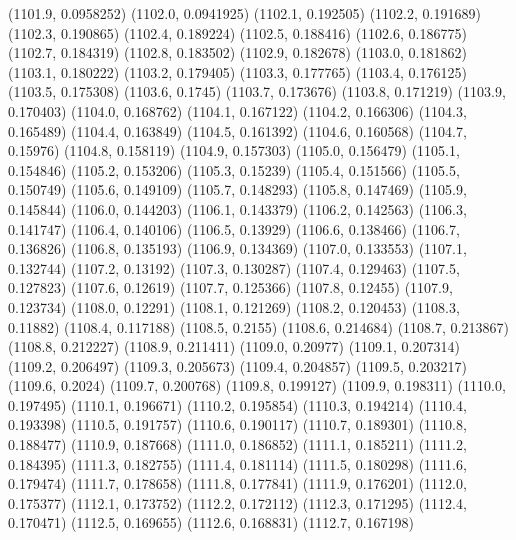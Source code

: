 {					(1101.9, 0.0958252)
					(1102.0, 0.0941925)
					(1102.1, 0.192505)
					(1102.2, 0.191689)
					(1102.3, 0.190865)
					(1102.4, 0.189224)
					(1102.5, 0.188416)
					(1102.6, 0.186775)
					(1102.7, 0.184319)
					(1102.8, 0.183502)
					(1102.9, 0.182678)
					(1103.0, 0.181862)
					(1103.1, 0.180222)
					(1103.2, 0.179405)
					(1103.3, 0.177765)
					(1103.4, 0.176125)
					(1103.5, 0.175308)
					(1103.6, 0.1745)
					(1103.7, 0.173676)
					(1103.8, 0.171219)
					(1103.9, 0.170403)
					(1104.0, 0.168762)
					(1104.1, 0.167122)
					(1104.2, 0.166306)
					(1104.3, 0.165489)
					(1104.4, 0.163849)
					(1104.5, 0.161392)
					(1104.6, 0.160568)
					(1104.7, 0.15976)
					(1104.8, 0.158119)
					(1104.9, 0.157303)
					(1105.0, 0.156479)
					(1105.1, 0.154846)
					(1105.2, 0.153206)
					(1105.3, 0.15239)
					(1105.4, 0.151566)
					(1105.5, 0.150749)
					(1105.6, 0.149109)
					(1105.7, 0.148293)
					(1105.8, 0.147469)
					(1105.9, 0.145844)
					(1106.0, 0.144203)
					(1106.1, 0.143379)
					(1106.2, 0.142563)
					(1106.3, 0.141747)
					(1106.4, 0.140106)
					(1106.5, 0.13929)
					(1106.6, 0.138466)
					(1106.7, 0.136826)
					(1106.8, 0.135193)
					(1106.9, 0.134369)
					(1107.0, 0.133553)
					(1107.1, 0.132744)
					(1107.2, 0.13192)
					(1107.3, 0.130287)
					(1107.4, 0.129463)
					(1107.5, 0.127823)
					(1107.6, 0.12619)
					(1107.7, 0.125366)
					(1107.8, 0.12455)
					(1107.9, 0.123734)
					(1108.0, 0.12291)
					(1108.1, 0.121269)
					(1108.2, 0.120453)
					(1108.3, 0.11882)
					(1108.4, 0.117188)
					(1108.5, 0.2155)
					(1108.6, 0.214684)
					(1108.7, 0.213867)
					(1108.8, 0.212227)
					(1108.9, 0.211411)
					(1109.0, 0.20977)
					(1109.1, 0.207314)
					(1109.2, 0.206497)
					(1109.3, 0.205673)
					(1109.4, 0.204857)
					(1109.5, 0.203217)
					(1109.6, 0.2024)
					(1109.7, 0.200768)
					(1109.8, 0.199127)
					(1109.9, 0.198311)
					(1110.0, 0.197495)
					(1110.1, 0.196671)
					(1110.2, 0.195854)
					(1110.3, 0.194214)
					(1110.4, 0.193398)
					(1110.5, 0.191757)
					(1110.6, 0.190117)
					(1110.7, 0.189301)
					(1110.8, 0.188477)
					(1110.9, 0.187668)
					(1111.0, 0.186852)
					(1111.1, 0.185211)
					(1111.2, 0.184395)
					(1111.3, 0.182755)
					(1111.4, 0.181114)
					(1111.5, 0.180298)
					(1111.6, 0.179474)
					(1111.7, 0.178658)
					(1111.8, 0.177841)
					(1111.9, 0.176201)
					(1112.0, 0.175377)
					(1112.1, 0.173752)
					(1112.2, 0.172112)
					(1112.3, 0.171295)
					(1112.4, 0.170471)
					(1112.5, 0.169655)
					(1112.6, 0.168831)
					(1112.7, 0.167198)
}
